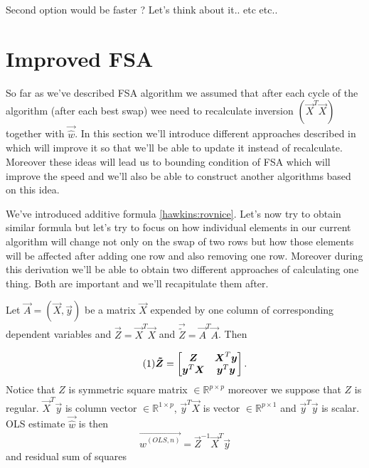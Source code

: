 Second option would be faster ? Let's think about it.. etc etc..



\section{Improved FSA} %
So far as we've described FSA algorithm we assumed that after each cycle of the algorithm (after each best swap) wee need to recalculate inversion $(\vec{X}^T\vec{X})$ together with $\vec{\hat{w}}$. In this section we'll introduce different approaches described in \cite{agullo2001new} which will improve it so that we'll be able to update it instead of recalculate. Moreover these ideas will lead us to bounding condition of FSA which will improve the speed and we'll also be able to construct another algorithms based on this idea. 

We've introduced additive formula \ref{hawkins:rovnice}. Let's now try to obtain similar formula but let's try to focus on how individual elements in our current algorithm will change not only on the swap of two rows but how those elements will be affected after adding one row and also removing one row. Moreover during this derivation we'll be able to obtain two different approaches of calculating one thing. Both are important and we'll recapitulate them after.


Let $\vec{A} = (\vec{X}, \vec{y})$ be a matrix $\vec{X}$ expended by one column of corresponding dependent variables and $\vec{Z} = \vec{X}^T\vec{X}$ and $\vec{\tilde{Z}} = \vec{A}^T\vec{A}$. Then

\[  \numberthis \label{matrixZ}
	\vec{\tilde{Z}} = \begin{bmatrix}
		\vec{Z} & \vec{X}^T\vec{y} \\
    \vec{y}^T\vec{X} & \vec{y}^T\vec{y}
  \end{bmatrix} .
\]
Notice that $Z$ is symmetric square matrix $\in \mathbb{R}^ {p \times p}$ moreover we suppose that $Z$ is regular. $\vec{X}^T\vec{y}$ is column vector $\in \mathbb{R}^ {1 \times p}$, $\vec{y}^T\vec{X}$ is vector $\in \mathbb{R}^ {p \times 1}$ and $\vec{y}^T\vec{y}$ is scalar.
OLS estimate $\vec{\hat{w}}$ is then
\begin{equation}
	\vec{\hat{w}^{(OLS, n)}} = \vec{Z}^{-1} \vec{X}^T\vec{y}
\end{equation}
and residual sum of squares 

